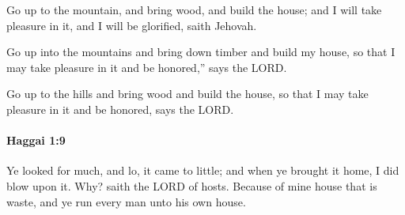 			\begin{versebox}
					\item[BHS] 
					\item[LXX] 
					\item[ASV] Go up to the mountain, and bring wood, and build the house; and I will take pleasure in it, and I will be glorified, saith Jehovah.
					\item[NIV] Go up into the mountains and bring down timber and build my house, so that I may take pleasure in it and be honored,” says the LORD.
					\item[NRSV] Go up to the hills and bring wood and build the house, so that I may take pleasure in it and be honored, says the LORD.
			\end{versebox}

		\paragraph{Haggai 1:9} %
			\label{HAGGAI-1-9}

			Ye looked for much, and lo, it came to little; and when ye brought it home, I did blow upon it. Why? saith the LORD of hosts. Because of mine house that is waste, and ye run every man unto his own house.

